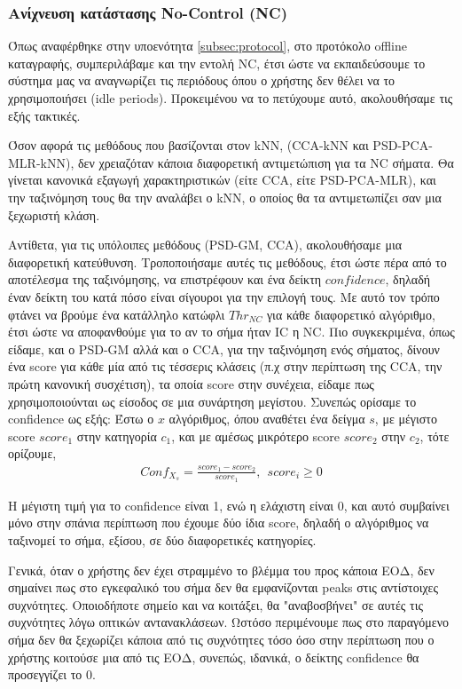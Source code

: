 \documentclass[11pt,a4paper,english,greek,twoside]{../Thesis}
\begin{document}
\subsubsection{Ανίχνευση κατάστασης No-Control (NC)}
\label{subsec:NC}
\par Όπως αναφέρθηκε στην υποενότητα \ref{subsec:protocol}, στο προτόκολο offline καταγραφής, συμπεριλάβαμε και την εντολή NC, έτσι ώστε να εκπαιδεύσουμε το σύστημα μας να αναγνωρίζει τις περιόδους όπου ο χρήστης δεν θέλει να το χρησιμοποιήσει (idle periods). Προκειμένου να το πετύχουμε αυτό, ακολουθήσαμε τις εξής τακτικές. 

\par Όσον αφορά τις μεθόδους που βασίζονται στον kNN, (CCA-kNN και PSD-PCA-MLR-kNN), δεν χρειαζόταν κάποια διαφορετική αντιμετώπιση για τα NC σήματα. Θα γίνεται κανονικά εξαγωγή χαρακτηριστικών (είτε CCA, είτε PSD-PCA-MLR), και την ταξινόμηση τους θα την αναλάβει ο kNN, ο οποίος θα τα αντιμετωπίζει σαν μια ξεχωριστή κλάση.

\par Αντίθετα, για τις υπόλοιπες μεθόδους (PSD-GM, CCA), ακολουθήσαμε μια διαφορετική κατεύθυνση. Τροποποιήσαμε αυτές τις μεθόδους, έτσι ώστε πέρα από το αποτέλεσμα της ταξινόμησης, να επιστρέφουν και ένα δείκτη $confidence$, δηλαδή έναν δείκτη του κατά πόσο είναι σίγουροι για την επιλογή τους. Με αυτό τον τρόπο φτάνει να βρούμε ένα κατάλληλο κατώφλι $Thr_{NC}$ για κάθε διαφορετικό αλγόριθμο, έτσι ώστε να αποφανθούμε για το αν το σήμα ήταν IC η NC. Πιο συγκεκριμένα, όπως είδαμε, και ο PSD-GM αλλά και ο CCA, για την ταξινόμηση ενός σήματος, δίνουν ένα score για κάθε μία από τις τέσσερις κλάσεις (π.χ στην περίπτωση της CCA, την πρώτη κανονική συσχέτιση), τα οποία score στην συνέχεια, είδαμε πως χρησιμοποιούνται ως είσοδος  σε μια συνάρτηση μεγίστου. Συνεπώς ορίσαμε το confidence ως εξής: Έστω ο $x$ αλγόριθμος, όπου αναθέτει ένα δείγμα $s$, με μέγιστο score $score_1$ στην κατηγορία $c_1$, και με αμέσως μικρότερο score $score_2$ στην $c_2$, τότε ορίζουμε,
\begin{align}
    Conf_{X_s} = \frac{score_1 - score_2}{score_1}, \ \ score_i\geqslant 0
\end{align}

Η μέγιστη τιμή για το confidence είναι 1, ενώ η ελάχιστη είναι 0, και αυτό συμβαίνει μόνο στην σπάνια περίπτωση που έχουμε δύο ίδια score, δηλαδή ο αλγόριθμος να ταξινομεί το σήμα, εξίσου, σε δύο διαφορετικές κατηγορίες. 
\par Γενικά, όταν ο χρήστης δεν έχει στραμμένο το βλέμμα του προς κάποια ΕΟΔ, δεν σημαίνει πως στο εγκεφαλικό του σήμα δεν θα εμφανίζονται peaks στις αντίστοιχες συχνότητες. Οποιοδήποτε σημείο και να κοιτάξει, θα "αναβοσβήνει" σε αυτές τις συχνότητες λόγω οπτικών αντανακλάσεων. Ωστόσο περιμένουμε πως στο παραγόμενο σήμα δεν θα ξεχωρίζει κάποια από τις συχνότητες τόσο όσο στην περίπτωση που ο χρήστης κοιτούσε μια από τις ΕΟΔ, συνεπώς, ιδανικά, ο δείκτης confidence θα προσεγγίζει το 0.
\end{document}
